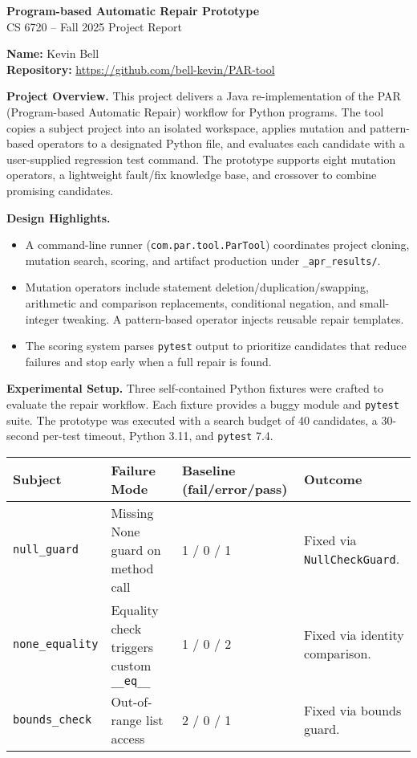 \documentclass[11pt]{article}
\begin{document}
\begin{center}
  {\LARGE\bfseries Program-based Automatic Repair Prototype}\\[0.5em]
  {CS 6720 -- Fall 2025 Project Report}
\end{center}

\textbf{Name:} Kevin Bell \\
\textbf{Repository:} \href{https://github.com/bell-kevin/PAR-tool}{https://github.com/bell-kevin/PAR-tool}

\textbf{Project Overview.} This project delivers a Java re-implementation of the PAR (Program-based Automatic Repair) workflow for Python programs. The tool copies a subject project into an isolated workspace, applies mutation and pattern-based operators to a designated Python file, and evaluates each candidate with a user-supplied regression test command. The prototype supports eight mutation operators, a lightweight fault/fix knowledge base, and crossover to combine promising candidates.

\textbf{Design Highlights.}
\begin{itemize}[leftmargin=1.25em]
  \item A command-line runner (\texttt{com.par.tool.ParTool}) coordinates project cloning, mutation search, scoring, and artifact production under \texttt{\_apr\_results/}.
  \item Mutation operators include statement deletion/duplication/swapping, arithmetic and comparison replacements, conditional negation, and small-integer tweaking. A pattern-based operator injects reusable repair templates.
  \item The scoring system parses \texttt{pytest} output to prioritize candidates that reduce failures and stop early when a full repair is found.
\end{itemize}

\textbf{Experimental Setup.} Three self-contained Python fixtures were crafted to evaluate the repair workflow. Each fixture provides a buggy module and \texttt{pytest} suite. The prototype was executed with a search budget of 40 candidates, a 30-second per-test timeout, Python 3.11, and \texttt{pytest} 7.4.

\begin{table}[h]
  \centering
  \begin{tabular}{@{}llll@{}}
    \toprule
    Subject & Failure Mode & Baseline (fail/error/pass) & Outcome \\
    \midrule
    \texttt{null\_guard} & Missing None guard on method call & 1 / 0 / 1 & Fixed via \texttt{NullCheckGuard}. \\
    \texttt{none\_equality} & Equality check triggers custom \texttt{\_\_eq\_\_} & 1 / 0 / 2 & Fixed via identity comparison. \\
    \texttt{bounds\_check} & Out-of-range list access & 2 / 0 / 1 & Fixed via bounds guard. \\
    \bottomrule
  \end{tabular}
\end{table}
\end{document}
